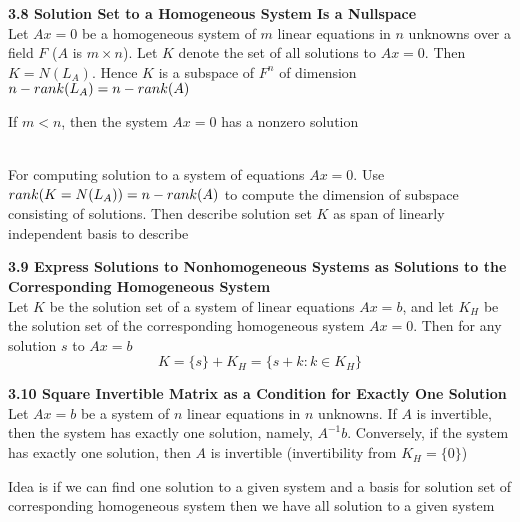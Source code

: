 \documentclass[11pt]{article}
\begin{document}
\begin{theorem*}
    \textbf{3.8 Solution Set to a Homogeneous System Is a Nullspace} \\
    Let $Ax=0$ be a homogeneous system of $m$ linear equations in $n$ unknowns over a field $F$ ($A$ is $m\times n$). Let $K$ denote the set of all solutions to $Ax=0$. Then $K=N(L_A)$. Hence $K$ is a subspace of $F^n$ of dimension $n-rank(L_A)=n-rank(A)$
\end{theorem*}

\begin{corollary*}
    If $m<n$, then the system $Ax=0$ has a nonzero solution
\end{corollary*}

\begin{rem}
     \\
    For computing solution to a system of equations $Ax=0$. Use $rank(K=N(L_A)) = n - rank(A)$ to compute the dimension of subspace consisting of solutions. Then describe solution set $K$ as span of linearly independent basis to describe
\end{rem}

\begin{theorem*}
    \textbf{3.9 Express Solutions to Nonhomogeneous Systems as Solutions to the Corresponding Homogeneous System}  \\
    Let $K$ be the solution set of a system of linear equations $Ax=b$, and let $K_H$ be the solution set of the corresponding homogeneous system $Ax=0$. Then for any solution $s$ to $Ax=b$
    \[
        K = \{s\} + K_H =\{s+k : k\in K_H\}    
    \]
\end{theorem*}

\begin{theorem*}
    \textbf{3.10 Square Invertible Matrix as a Condition for Exactly One Solution} \\
    Let $Ax = b$ be a system of $n$ linear equations in $n$ unknowns. If $A$ is invertible, then the system has exactly one solution, namely, $A^{-1}b$. Conversely, if the system has exactly one solution, then $A$ is invertible (invertibility from $K_H = \{0\}$)
    \begin{rem}
        Idea is if we can find one solution to a given system and a basis for solution set of corresponding homogeneous system then we have all solution to a given system
    \end{rem}
\end{theorem*}
\end{document}
